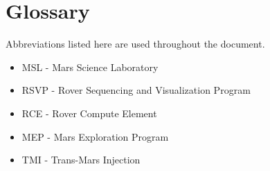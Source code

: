 \chapter*{Glossary}

Abbreviations listed here are used throughout the document.

\begin{itemize}
\item MSL - Mars Science Laboratory
\item RSVP - Rover Sequencing and Visualization Program
\item RCE - Rover Compute Element
\item MEP - Mars Exploration Program
\item TMI - Trans-Mars Injection
\end{itemize}